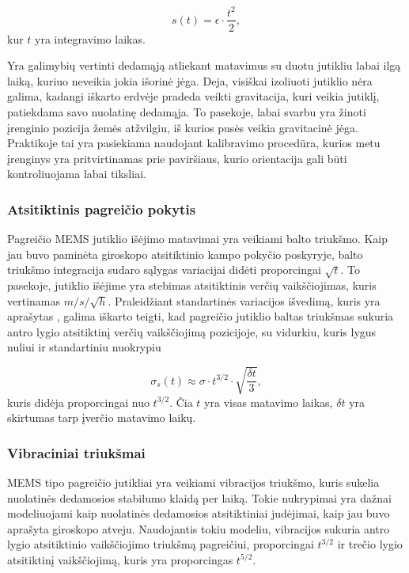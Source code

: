 \begin{equation}
    s(t) = \epsilon \cdot \frac{t^2}{2},
\end{equation}
kur $t$ yra integravimo laikas.

Yra galimybių vertinti dedamąją atliekant matavimus su duotu jutikliu labai ilgą laiką, kuriuo neveikia jokia išorinė jėga. 
Deja, visiškai izoliuoti jutiklio nėra galima, kadangi iškarto erdvėje pradeda veikti gravitacija, kuri veikia jutiklį, patiekdama savo nuolatinę dedamąja. 
To pasekoje, labai svarbu yra žinoti įrenginio pozicija žemės atžvilgiu, iš kurios pusės veikia gravitacinė jėga. Praktikoje tai yra pasiekiama naudojant kalibravimo procedūra, kurios metu įrenginys yra pritvirtinamas prie paviršiaus, kurio orientacija gali būti kontroliuojama labai tiksliai.

\subsubsection{Atsitiktinis pagreičio pokytis}

Pagreičio MEMS jutiklio išėjimo matavimai yra veikiami balto triukšmo. 
Kaip jau buvo paminėta giroskopo atsitiktinio kampo pokyčio poskyryje, balto triukšmo integracija sudaro sąlygas variacijai didėti proporcingai $\sqrt{t}$. 
To pasekoje, jutiklio išėjime yra stebimas atsitiktinis verčių vaikščiojimas, kuris vertinamas $m/s/\sqrt{h}$. Praleidžiant standartinės variacijos išvedimą, kuris yra aprašytas \cite{woodman2007introduction}, galima iškarto teigti, kad pagreičio jutiklio baltas triukšmas sukuria antro lygio atsitiktinį verčių vaikščiojimą pozicijoje, su vidurkiu, kuris lygus nuliui ir standartiniu nuokrypiu

\begin{equation}
    \sigma_{s}(t) \approx \sigma \cdot t^{3/2} \cdot \sqrt{\frac{\delta t}{3}},
\end{equation}
kuris didėja proporcingai nuo $t^{3/2}$. 
Čia $t$ yra visas matavimo laikas, $\delta t$ yra skirtumas tarp įverčio matavimo laikų.

\subsubsection{Vibraciniai triukšmai}

MEMS tipo pagreičio jutikliai yra veikiami vibracijos triukšmo, kuris sukelia nuolatinės dedamosios stabilumo klaidą per laiką. 
Tokie nukrypimai yra dažnai modeliuojami kaip nuolatinės dedamosios atsitiktiniai judėjimai, kaip jau buvo aprašyta giroskopo atveju. 
Naudojantis tokiu modeliu, vibracijos sukuria antro lygio atsitiktinio vaikščiojimo triukšmą pagreičiui, proporcingai $t^{3/2}$ ir trečio lygio atsitiktinį vaikščiojimą, kuris yra proporcingas $t^{5/2}$.

